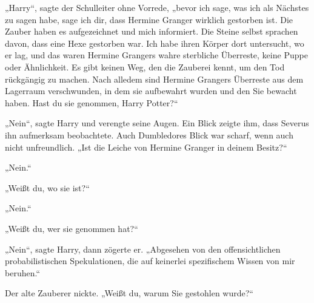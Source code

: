 „Harry“, sagte der Schulleiter ohne Vorrede, „bevor ich sage, was ich als Nächstes zu sagen habe, sage ich dir, dass Hermine Granger wirklich gestorben ist. Die Zauber haben es aufgezeichnet und mich informiert. Die Steine selbst sprachen davon, dass eine Hexe gestorben war. Ich habe ihren Körper dort untersucht, wo er lag, und das waren Hermine Grangers wahre sterbliche Überreste, keine Puppe oder Ähnlichkeit. Es gibt keinen Weg, den die Zauberei kennt, um den Tod rückgängig zu machen. Nach alledem sind Hermine Grangers Überreste aus dem Lagerraum verschwunden, in dem sie aufbewahrt wurden und den Sie bewacht haben. Hast du sie genommen, Harry Potter?“


„Nein“, sagte Harry und verengte seine Augen.
Ein Blick zeigte ihm, dass Severus ihn aufmerksam beobachtete. Auch Dumbledores Blick war scharf, wenn auch nicht unfreundlich. „Ist die Leiche von Hermine Granger in deinem Besitz?“

„Nein.“

„Weißt du, wo sie ist?“

„Nein.“

„Weißt du, wer sie genommen hat?“

„Nein“, sagte Harry, dann zögerte er. „Abgesehen von den offensichtlichen probabilistischen Spekulationen, die auf keinerlei spezifischem Wissen von mir beruhen.“

Der alte Zauberer nickte.
„Weißt du, warum Sie gestohlen wurde?“

